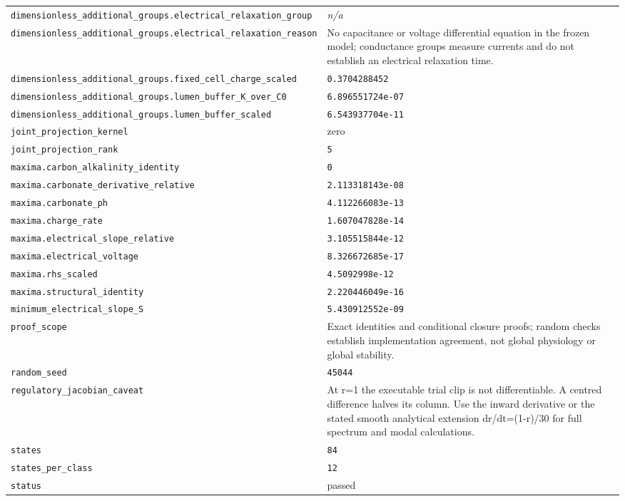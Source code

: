 \begin{longtable}{p{.46\linewidth}p{.46\linewidth}}
\nolinkurl{dimensionless_additional_groups.electrical_relaxation_group} & \textit{n/a} \\
\nolinkurl{dimensionless_additional_groups.electrical_relaxation_reason} & No capacitance or voltage differential equation in the frozen model; conductance groups measure currents and do not establish an electrical relaxation time. \\
\nolinkurl{dimensionless_additional_groups.fixed_cell_charge_scaled} & \texttt{0.3704288452} \\
\nolinkurl{dimensionless_additional_groups.lumen_buffer_K_over_C0} & \texttt{6.896551724e-07} \\
\nolinkurl{dimensionless_additional_groups.lumen_buffer_scaled} & \texttt{6.543937704e-11} \\
\nolinkurl{joint_projection_kernel} & zero \\
\nolinkurl{joint_projection_rank} & \texttt{5} \\
\nolinkurl{maxima.carbon_alkalinity_identity} & \texttt{0} \\
\nolinkurl{maxima.carbonate_derivative_relative} & \texttt{2.113318143e-08} \\
\nolinkurl{maxima.carbonate_ph} & \texttt{4.112266083e-13} \\
\nolinkurl{maxima.charge_rate} & \texttt{1.607047828e-14} \\
\nolinkurl{maxima.electrical_slope_relative} & \texttt{3.105515844e-12} \\
\nolinkurl{maxima.electrical_voltage} & \texttt{8.326672685e-17} \\
\nolinkurl{maxima.rhs_scaled} & \texttt{4.5092998e-12} \\
\nolinkurl{maxima.structural_identity} & \texttt{2.220446049e-16} \\
\nolinkurl{minimum_electrical_slope_S} & \texttt{5.430912552e-09} \\
\nolinkurl{proof_scope} & Exact identities and conditional closure proofs; random checks establish implementation agreement, not global physiology or global stability. \\
\nolinkurl{random_seed} & \texttt{45044} \\
\nolinkurl{regulatory_jacobian_caveat} & At r=1 the executable trial clip is not differentiable. A centred difference halves its column. Use the inward derivative or the stated smooth analytical extension dr/dt=(1-r)/30 for full spectrum and modal calculations. \\
\nolinkurl{states} & \texttt{84} \\
\nolinkurl{states_per_class} & \texttt{12} \\
\nolinkurl{status} & passed \\
\end{longtable}
\endgroup



